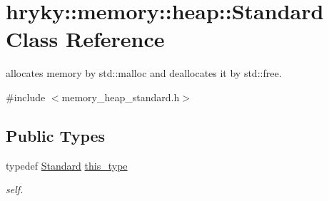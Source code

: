 \hypertarget{classhryky_1_1memory_1_1heap_1_1_standard}{\section{hryky\-:\-:memory\-:\-:heap\-:\-:Standard Class Reference}
\label{classhryky_1_1memory_1_1heap_1_1_standard}
}


allocates memory by std\-::malloc and deallocates it by std\-::free.  




{\ttfamily \#include $<$memory\-\_\-heap\-\_\-standard.\-h$>$}

\subsection*{Public Types}
\begin{DoxyCompactItemize}
\item 
\hypertarget{classhryky_1_1memory_1_1heap_1_1_standard_a003f38bc62a4f7e24cd43a4f14722cc2}{typedef \hyperlink{classhryky_1_1memory_1_1heap_1_1_standard}{Standard} \hyperlink{classhryky_1_1memory_1_1heap_1_1_standard_a003f38bc62a4f7e24cd43a4f14722cc2}{this\-\_\-type}}\label{classhryky_1_1memory_1_1heap_1_1_standard_a003f38bc62a4f7e24cd43a4f14722cc2}

\begin{DoxyCompactList}\small\item\em self. \end{DoxyCompactList}\end{DoxyCompactItemize}
